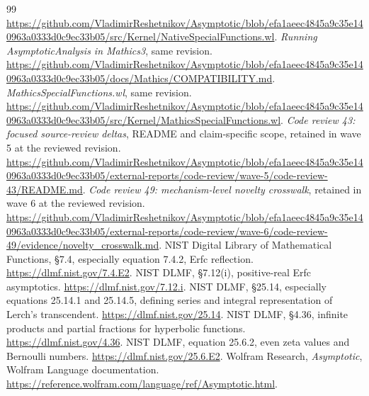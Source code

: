 \documentclass[11pt,a4paper]{article}
\begin{document}
\begin{thebibliography}{99}
\url{https://github.com/VladimirReshetnikov/Asymptotic/blob/efa1aeec4845a9c35e140963a0333d0c9ec33b05/src/Kernel/NativeSpecialFunctions.wl}.
 \emph{Running AsymptoticAnalysis in Mathics3}, same revision.
\url{https://github.com/VladimirReshetnikov/Asymptotic/blob/efa1aeec4845a9c35e140963a0333d0c9ec33b05/docs/Mathics/COMPATIBILITY.md}.
 \emph{MathicsSpecialFunctions.wl}, same revision.
\url{https://github.com/VladimirReshetnikov/Asymptotic/blob/efa1aeec4845a9c35e140963a0333d0c9ec33b05/src/Kernel/MathicsSpecialFunctions.wl}.
 \emph{Code review 43: focused source-review deltas}, README and
claim-specific scope, retained in wave 5 at the reviewed revision.
\url{https://github.com/VladimirReshetnikov/Asymptotic/blob/efa1aeec4845a9c35e140963a0333d0c9ec33b05/external-reports/code-review/wave-5/code-review-43/README.md}.
 \emph{Code review 49: mechanism-level novelty crosswalk},
retained in wave 6 at the reviewed revision.
\url{https://github.com/VladimirReshetnikov/Asymptotic/blob/efa1aeec4845a9c35e140963a0333d0c9ec33b05/external-reports/code-review/wave-6/code-review-49/evidence/novelty_crosswalk.md}.
 NIST Digital Library of Mathematical Functions,
\S7.4, especially equation 7.4.2, Erfc reflection.
\url{https://dlmf.nist.gov/7.4.E2}.
 NIST DLMF, \S7.12(i), positive-real Erfc asymptotics.
\url{https://dlmf.nist.gov/7.12.i}.
 NIST DLMF, \S25.14, especially equations 25.14.1 and 25.14.5,
defining series and integral representation of Lerch's transcendent.
\url{https://dlmf.nist.gov/25.14}.
 NIST DLMF, \S4.36, infinite products and partial fractions for
hyperbolic functions.
\url{https://dlmf.nist.gov/4.36}.
 NIST DLMF, equation 25.6.2, even zeta values and Bernoulli numbers.
\url{https://dlmf.nist.gov/25.6.E2}.
 Wolfram Research, \emph{Asymptotic}, Wolfram Language documentation.
\url{https://reference.wolfram.com/language/ref/Asymptotic.html}.
\end{thebibliography}
\end{document}
